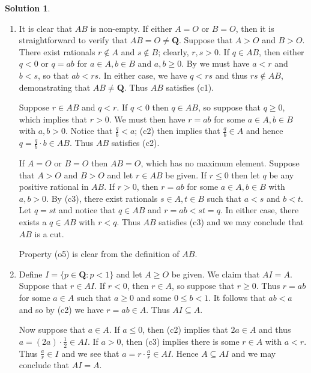 \documentclass[12pt]{article}
\theoremstyle{definition}
\theoremstyle{exercise}
\theoremstyle{solution}
\newtheorem*{solution}{Solution}
\newcommand{\Q}{\mathbf{Q}}
\begin{document}
\begin{solution}
    \begin{enumerate}
        \item It is clear that \( AB \) is non-empty. If either \( A = O \) or \( B = O \), then it is straightforward to verify that \( AB = O \neq \Q \). Suppose that \( A > O \) and \( B > O \). There exist rationals \( r \not\in A \) and \( s \not\in B \); clearly, \( r, s > 0 \). If \( q \in AB \), then either \( q < 0 \) or \( q = ab \) for \( a \in A, b \in B \) and \( a, b \geq 0 \). By  we must have \( a < r \) and \( b < s \), so that \( ab < rs \). In either case, we have \( q < rs \) and thus \( rs \not\in AB \), demonstrating that \( AB \neq \Q \). Thus \( AB \) satisfies (c1).

        Suppose \( r \in AB \) and \( q < r \). If \( q < 0 \) then \( q \in AB \), so suppose that \( q \geq 0 \), which implies that \( r > 0 \). We must then have \( r = ab \) for some \( a \in A, b \in B \) with \( a, b > 0 \). Notice that \( \tfrac{q}{b} < a \); (c2) then implies that \( \tfrac{q}{b} \in A \) and hence \( q = \tfrac{q}{b} \cdot b \in AB \). Thus \( AB \) satisfies (c2).

        If \( A = O \) or \( B = O \) then \( AB = O \), which has no maximum element. Suppose that \( A > O \) and \( B > O \) and let \( r \in AB \) be given. If \( r \leq 0 \) then let \( q \) be any positive rational in \( AB \). If \( r > 0 \), then \( r = ab \) for some \( a \in A, b \in B \) with \( a, b > 0 \). By (c3), there exist rationals \( s \in A, t \in B \) such that \( a < s \) and \( b < t \). Let \( q = st \) and notice that \( q \in AB \) and \( r = ab < st = q \). In either case, there exists a \( q \in AB \) with \( r < q \). Thus \( AB \) satisfies (c3) and we may conclude that \( AB \) is a cut.

        Property (o5) is clear from the definition of \( AB \).

        \item Define \( I = \{ p \in \Q : p < 1 \} \) and let \( A \geq O \) be given. We claim that \( AI = A \). Suppose that \( r \in AI \). If \( r < 0 \), then \( r \in A \), so suppose that \( r \geq 0 \). Thus \( r = ab \) for some \( a \in A \) such that \( a \geq 0 \) and some \( 0 \leq b < 1 \). It follows that \( ab < a \) and so by (c2) we have \( r = ab \in A \). Thus \( AI \subseteq A \).

        Now suppose that \( a \in A \). If \( a \leq 0 \), then (c2) implies that \( 2a \in A \) and thus \( a = (2a) \cdot \tfrac{1}{2} \in AI \). If \( a > 0 \), then (c3) implies there is some \( r \in A \) with \( a < r \). Thus \( \tfrac{a}{r} \in I \) and we see that \( a = r \cdot \tfrac{a}{r} \in AI \). Hence \( A \subseteq AI \) and we may conclude that \( AI = A \).


\end{enumerate}
\end{solution}
\end{document}

